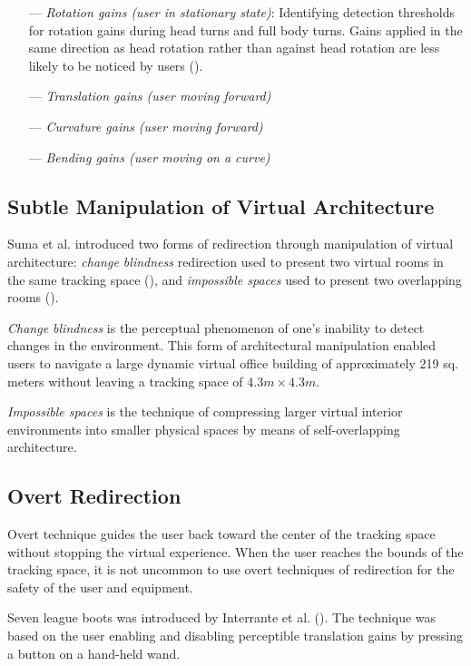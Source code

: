 \documentclass[12pt]{article}
\begin{document}
\begin{itemize}[noitemsep]
    \item[---] \emph{Rotation gains (user in stationary state)}: Identifying detection thresholds for rotation gains during head turns and full body turns. Gains applied in the same direction as head rotation rather than against head rotation are less likely to be noticed by users (\cite{jerald2008sensitivity}).
    \item[---] \emph{Translation gains (user moving forward)}
    \item[---] \emph{Curvature gains (user moving forward)}
    \item[---] \emph{Bending gains (user moving on a curve)}
\end{itemize}

\subsection{Subtle Manipulation of Virtual Architecture}

Suma et al. introduced two forms of redirection through manipulation of virtual architecture: \emph{change blindness} redirection used to present two virtual rooms in the same tracking space (\cite{suma2011leveraging}), and \emph{impossible spaces} used to present two overlapping rooms (\cite{suma2012impossible}).

\emph{Change blindness} is the perceptual phenomenon of one's inability to detect changes in the environment. This form of architectural manipulation enabled users to navigate a large dynamic virtual office building of approximately 219 sq. meters without leaving a tracking space of $4.3m \times 4.3m$.

\emph{Impossible spaces} is the technique of compressing larger virtual interior environments into smaller physical spaces by means of self-overlapping architecture.

\subsection{Overt Redirection}

Overt technique guides the user back toward the center of the tracking space without stopping the virtual experience. When the user reaches the bounds of the tracking space, it is not uncommon to use overt techniques of redirection for the safety of the user and equipment.

Seven league boots was introduced by Interrante et al. (\cite{interrante2007seven}). The technique was based on the user enabling and disabling perceptible translation gains by pressing a button on a hand-held wand.
\end{document}
